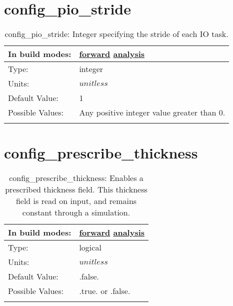 \section[config\_pio\_stride]{config\_pio\_stride}
\label{sec:nm_sec_config_pio_stride}
\begin{center}
\begin{longtable}{| p{2.0in} || p{4.0in} |}
    \hline
    In build modes: & \hyperref[subsec:forward_nm_tab_io]{forward} \hyperref[subsec:analysis_nm_tab_io]{analysis} \\
    \hline
    Type: & integer \\
    \hline
    Units: & $unitless$ \\
    \hline
    Default Value: & 1 \\
    \hline
    Possible Values: & Any positive integer value greater than 0. \\
    \hline
    \caption{config\_pio\_stride: Integer specifying the stride of each IO task.}
\end{longtable}
\end{center}
\section[config\_prescribe\_thickness]{config\_prescribe\_thickness}
\label{sec:nm_sec_config_prescribe_thickness}
\begin{center}
\begin{longtable}{| p{2.0in} || p{4.0in} |}
    \hline
    In build modes: & \hyperref[subsec:forward_nm_tab_debug]{forward} \hyperref[subsec:analysis_nm_tab_debug]{analysis} \\
    \hline
    Type: & logical \\
    \hline
    Units: & $unitless$ \\
    \hline
    Default Value: & .false. \\
    \hline
    Possible Values: & .true. or .false. \\
    \hline
    \caption{config\_prescribe\_thickness: Enables a prescribed thickness field. This thickness field is read on input, and remains constant through a simulation.}
\end{longtable}
\end{center}
